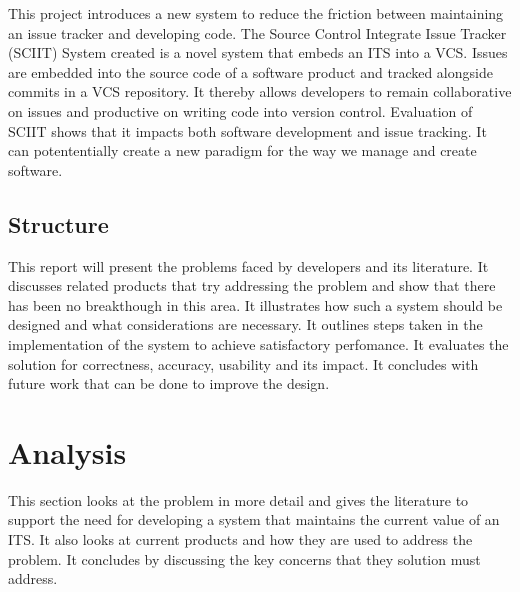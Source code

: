 \documentclass{mproj}
\begin{document}
This project introduces a new system to reduce the friction between maintaining an issue tracker and developing code. The Source Control Integrate Issue Tracker (SCIIT) System created is a novel system that embeds an ITS into a VCS. Issues are embedded into the source code of a software product and tracked alongside commits in a VCS repository. It thereby allows developers to remain collaborative on issues and productive on writing code into version control. Evaluation of SCIIT shows that it impacts both software development and issue tracking. It can potententially create a new paradigm for the way we manage and create software.


\section{Structure}

This report will present the problems faced by developers and its literature. It discusses related products that try addressing the problem and show that there has been no breakthough in this area. It illustrates how such a system should be designed and what considerations are necessary. It outlines steps taken in the implementation of the system to achieve satisfactory perfomance. It evaluates the solution for correctness, accuracy, usability and its impact. It concludes with future work that can be done to improve the design.





\chapter{Analysis}\label{analysis}

This section looks at the problem in more detail and gives the literature to support the need for developing a system that maintains the current value of an ITS. It also looks at current products and how they are used to address the problem. It concludes by discussing the key concerns that they solution must address.
\end{document}
